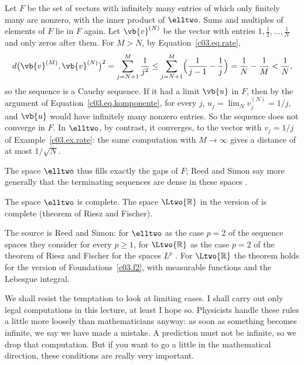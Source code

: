 \begin{fundament}
  \begin{example}\label{c03.ex.endlich}
    Let $F$ be the set of vectors with infinitely many entries of which only finitely many
    are nonzero, with the inner product of $\elltwo$. Sums and multiples of elements of $F$
    lie in $F$ again. Let $\vb{v}^{(N)}$ be the vector with entries
    $1, \tfrac12, \dots, \tfrac1N$ and only zeros after them. For $M > N$, by
    Equation~\eqref{c03.eq.rate},
    \begin{equation}\label{c03.eq.endlich}
      d\bigl(\vb{v}^{(M)}, \vb{v}^{(N)}\bigr)^2
      = \sum_{j=N+1}^{M} \frac{1}{j^2}
      \leq \sum_{j=N+1}^{M} \Bigl( \frac{1}{j-1} - \frac{1}{j} \Bigr)
      = \frac{1}{N} - \frac{1}{M} < \frac{1}{N} ,
    \end{equation}
    so the sequence is a Cauchy sequence. If it had a limit $\vb{u}$ in $F$, then by the
    argument of Equation~\eqref{c03.eq.komponente}, for every $j$,
    $u_j = \lim_{N} v_j^{(N)} = 1/j$, and $\vb{u}$ would have infinitely many nonzero
    entries. So the sequence does not converge in $F$. In $\elltwo$, by contrast, it
    converges, to the vector with $v_j = 1/j$ of Example~\ref{c03.ex.rate}: the same
    computation with $M \to \infty$ gives a distance of at most $1/\sqrt{N}$.
  \end{example}

  The space $\elltwo$ thus fills exactly the gaps of $F$; Reed and Simon say more generally
  that the terminating sequences are dense in these spaces .

  \begin{theorem}\label{c03.thm.vollstaendig}
    The space $\elltwo$ is complete. The space $\Ltwo{\mathbb{R}}$ in the version of
     is complete (theorem of Riesz and Fischer).
  \end{theorem}

  The source is Reed and Simon: for $\elltwo$ as the case $p = 2$ of the sequence spaces they
  consider for every $p \geq 1$, for $\Ltwo{\mathbb{R}}$ as the case $p = 2$ of the theorem of
  Riesz and Fischer for the spaces $L^p$ . For
  $\Ltwo{\mathbb{R}}$ the theorem holds for the version of Foundations~\ref{c03.f2}, with
  measurable functions and the Lebesgue integral.

  We shall resist the temptation to look at limiting cases. I shall carry out only legal
  computations in this lecture, at least I hope so. Physicists handle these rules a little
  more loosely than mathematicians anyway: as soon as something becomes infinite, we say we
  have made a mistake. A prediction must not be infinite, so we drop that computation. But
  if you want to go a little in the mathematical direction, these conditions are really very
  important.


\end{fundament}
